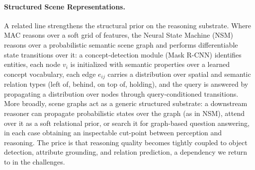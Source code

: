 \paragraph{Structured Scene Representations.}
A related line strengthens the structural prior on the reasoning substrate.
Where MAC reasons over a soft grid of features, the Neural State Machine (NSM)~\cite{hudson2019learning} reasons over a probabilistic semantic scene graph and performs differentiable state transitions over it: a concept-detection module (Mask R-CNN) identifies entities, each node $v_i$ is initialized with semantic properties over a learned concept vocabulary, each edge $e_{ij}$ carries a distribution over spatial and semantic relation types (left of, behind, on top of, holding), and the query is answered by propagating a distribution over nodes through query-conditioned transitions.
More broadly, scene graphs act as a generic structured substrate: a downstream reasoner can propagate probabilistic states over the graph (as in NSM), attend over it as a soft relational prior, or search it for graph-based question answering, in each case obtaining an inspectable cut-point between perception and reasoning.
The price is that reasoning quality becomes tightly coupled to object detection, attribute grounding, and relation prediction, a dependency we return to in the challenges.


